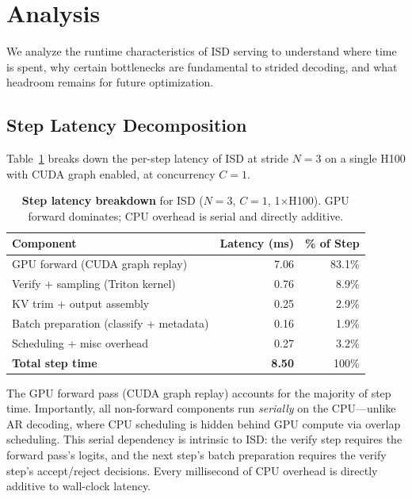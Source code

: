\section{Analysis}
\label{sec:analysis}

We analyze the runtime characteristics of ISD serving to understand where time is spent, why certain bottlenecks are fundamental to strided decoding, and what headroom remains for future optimization.

\subsection{Step Latency Decomposition}
\label{sec:step_breakdown}

Table~\ref{tab:step_breakdown} breaks down the per-step latency of ISD at stride $N{=}3$ on a single H100 with CUDA graph enabled, at concurrency $C{=}1$.

\begin{table}[t]
\centering
\caption{\textbf{Step latency breakdown} for ISD ($N{=}3$, $C{=}1$, 1$\times$H100). GPU forward dominates; CPU overhead is serial and directly additive.}
\label{tab:step_breakdown}
\small
\begin{tabular}{lrr}
\toprule
\textbf{Component} & \textbf{Latency (ms)} & \textbf{\% of Step} \\
\midrule
GPU forward (CUDA graph replay) & 7.06 & 83.1\% \\
Verify + sampling (Triton kernel) & 0.76 & 8.9\% \\
KV trim + output assembly & 0.25 & 2.9\% \\
Batch preparation (classify + metadata) & 0.16 & 1.9\% \\
Scheduling + misc overhead & 0.27 & 3.2\% \\
\midrule
\textbf{Total step time} & \textbf{8.50} & 100\% \\
\bottomrule
\end{tabular}
\end{table}

The GPU forward pass (CUDA graph replay) accounts for the majority of step time. Importantly, all non-forward components run \emph{serially} on the CPU---unlike AR decoding, where CPU scheduling is hidden behind GPU compute via overlap scheduling. This serial dependency is intrinsic to ISD: the verify step requires the forward pass's logits, and the next step's batch preparation requires the verify step's accept/reject decisions. Every millisecond of CPU overhead is directly additive to wall-clock latency.

